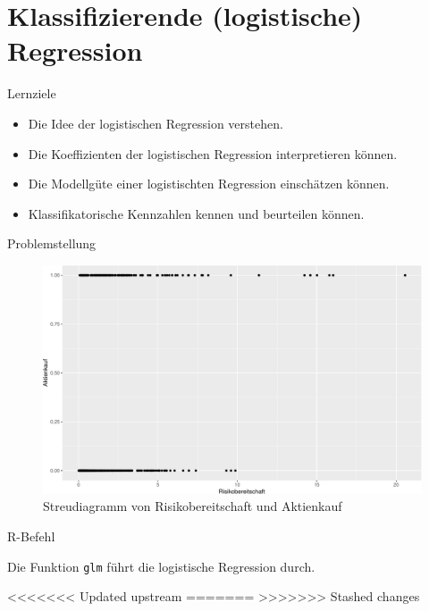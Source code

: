 \section{Klassifizierende (logistische)
Regression}\label{klassifizierende-logistische-regression}

\begin{frame}{Lernziele}

\begin{itemize}
\tightlist
\item
  Die Idee der logistischen Regression verstehen.
\item
  Die Koeffizienten der logistischen Regression interpretieren können.
\item
  Die Modellgüte einer logistischten Regression einschätzen können.
\item
  Klassifikatorische Kennzahlen kennen und beurteilen können.
\end{itemize}

\end{frame}

\begin{frame}{Problemstellung}

\begin{figure}

{\centering \includegraphics[width=0.5\linewidth]{PraDa_Folien_nm_2_files/figure-beamer/fig-logist-regr1-1} 

}

\caption{Streudiagramm von Risikobereitschaft und Aktienkauf}\label{fig:fig-logist-regr1}
\end{figure}

\end{frame}

\begin{frame}[fragile]{R-Befehl}

Die Funktion \texttt{glm} führt die logistische Regression durch.

\begin{Shaded}
\begin{Highlighting}[]
<<<<<<< Updated upstream
\StringTok{ }\OperatorTok{~}\StringTok{ } \NormalTok{(}\NormalTok{), }
=======
\StringTok{ }\StringTok{ } \NormalTok{(}\NormalTok{), } 
>>>>>>> Stashed changes
\end{Highlighting}
\end{Shaded}

\end{frame}

